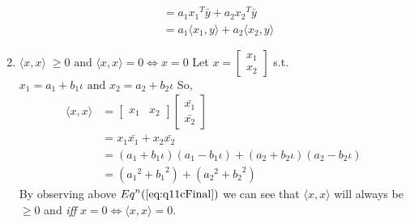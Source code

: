\documentclass[a4paper]{article}
\begin{document}
\begin{qalist}
\begin{enumerate}[label=\alph*., align=left]
\begin{align}
					&= {a}_{1}{{x}_{1}}^{T}\bar{y} + {a}_{2}{{x}_{2}}^{T}\bar{y} \\
					&= {a}_{1}\langle {x}_{1}, y \rangle + {a}_{2}\langle {x}_{2}, y \rangle
				\end{align} 
				
			\item $\langle x,x \rangle \;\geq 0 \text{ and } \langle x,x \rangle = 0 \Leftrightarrow x = 0$
				Let $x = \begin{bmatrix}{x}_{1} \\ {x}_{2}\end{bmatrix}$ s.t. ${x}_{1} = {a}_{1} + {b}_{1}\iota \text{ and } {x}_{2} = {a}_{2} + {b}_{2}\iota$ So, 
				\begin{align}
					\langle x,x \rangle &= \begin{bmatrix}{x}_{1} & {x}_{2}\end{bmatrix}\begin{bmatrix}\bar{{x}_{1}} \\ \bar{{x}_{2}}\end{bmatrix} \\
					&= {x}_{1}\bar{{x}_{1}} + {x}_{2}\bar{{x}_{2}} \\
					&= ({a}_{1} + {b}_{1}\iota)({a}_{1} - {b}_{1}\iota) + ({a}_{2} + {b}_{2}\iota)({a}_{2} - {b}_{2}\iota) \\ 
					&= ({{a}_{1}}^{2} + {{b}_{1}}^{2}) + ({{a}_{2}}^{2} + {{b}_{2}}^{2}) \label{eq:q11cFinal}
				\end{align}
				By observing above  ${Eq}^{n}(\ref{eq:q11cFinal})$ we can see that $\langle x,x \rangle$ will always be $\geq 0$ and \textit{iff} $x = 0 \Leftrightarrow \langle x,x \rangle = 0$.
		\end{enumerate}
		

\end{qalist}
\end{document}
